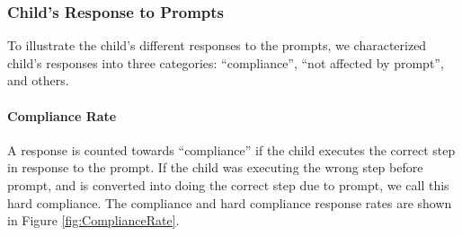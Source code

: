 \subsubsection{Child's Response to Prompts}
To illustrate the child's different responses to the prompts, we characterized child's responses into three categories: ``compliance'', ``not affected by prompt'', and others.

\paragraph{Compliance Rate}
A response is counted towards ``compliance'' if the child executes the correct step in response to the prompt.  If the child was executing the wrong step before prompt, and is converted into doing the correct step due to prompt, we call this hard compliance.  The compliance and hard compliance response rates are shown in Figure \ref{fig:ComplianceRate}.

